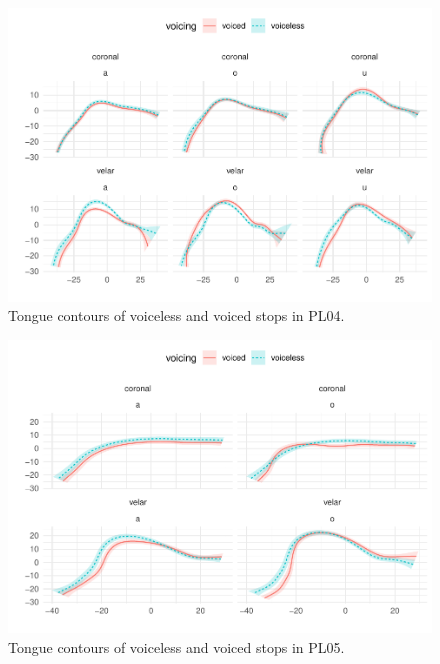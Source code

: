 \documentclass[11pt,]{article}
\begin{document}
\begin{figure}

{\centering \includegraphics[width=.8\textwidth]{2018-polar-gam_files/figure-latex/Figure15} 

}

\caption{Tongue contours of voiceless and voiced stops in PL04.}\label{f:Figure15}
\end{figure}

\begin{figure}

{\centering \includegraphics[width=.8\textwidth]{2018-polar-gam_files/figure-latex/Figure16} 

}

\caption{Tongue contours of voiceless and voiced stops in PL05.}\label{f:Figure16}
\end{figure}
\end{document}
